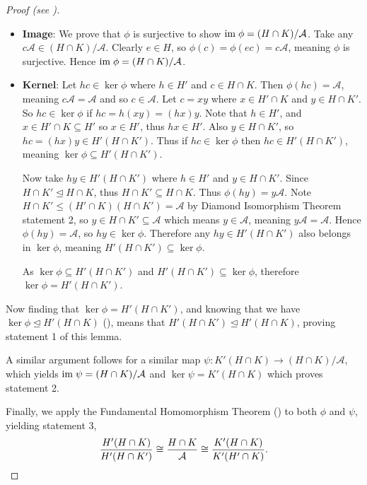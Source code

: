 \begin{proof}[Proof (see {\cite[Lemma I.8.9]{hungerford_1980}})]
\begin{itemize}
        \item \textbf{Image}: We prove that $\phi$ is surjective to show $\mathrm{im}\; \phi = (H\cap K)/\mathcal{A}$. Take any $c\mathcal{A} \in (H\cap K) / \mathcal{A}$. Clearly $e \in H$, so $\phi(c) = \phi(ec) = c\mathcal{A}$, meaning $\phi$ is surjective. Hence $\mathrm{im}\; \phi = (H\cap K)/\mathcal{A}$.

        \item \textbf{Kernel}: Let $hc \in \ker\phi$ where $h \in H'$ and $c \in H \cap K$. Then $\phi(hc) = \mathcal{A}$, meaning $c\mathcal{A} = \mathcal{A}$ and so $c \in \mathcal{A}$. Let $c = xy$ where $x \in H'\cap K$ and $y \in H \cap K'$. So $hc \in \ker\phi$ if $hc = h(xy) = (hx)y$. Note that $h \in H'$, and $x \in H' \cap K \subseteq H'$ so $x \in H'$, thus $hx \in H'$. Also $y \in H \cap K'$, so $hc = (hx)y \in H'(H \cap K')$. Thus if $hc \in \ker\phi$ then $hc \in H'(H \cap K')$, meaning $\ker\phi \subseteq H'(H \cap K')$.

        Now take $hy \in H'(H \cap K')$ where $h \in H'$ and $y \in H \cap K'$. Since $H \cap K' \unlhd H \cap K$, thus $H \cap K' \subseteq H \cap K$. Thus $\phi(hy) = y\mathcal{A}$. Note $H \cap K' \leq (H' \cap K)(H \cap K') = \mathcal{A}$ by Diamond Isomorphism Theorem statement 2, so $y \in H \cap K' \subseteq \mathcal{A}$ which means $y \in \mathcal{A}$, meaning $y\mathcal{A} = \mathcal{A}$. Hence $\phi(hy) = \mathcal{A}$, so $hy \in \ker\phi$. Therefore any $hy \in H'(H \cap K')$ also belongs in $\ker\phi$, meaning $H'(H \cap K') \subseteq \ker\phi$.

        As $\ker\phi \subseteq H'(H\cap K')$ and $H'(H\cap K') \subseteq \ker\phi$, therefore $\ker\phi = H'(H \cap K')$.
    \end{itemize}

    Now finding that $\ker\phi = H'(H \cap K')$, and knowing that we have $\ker\phi \unlhd H'(H\cap K)$ (), means that $H'(H \cap K') \unlhd H'(H\cap K)$, proving statement 1 of this lemma.

    A similar argument follows for a similar map $\psi: K'(H\cap K) \to (H\cap K)/\mathcal{A}$, which yields $\mathrm{im}\;\psi = (H\cap K)/\mathcal{A}$ and $\ker\psi = K'(H\cap K)$ which proves statement 2.

    Finally, we apply the Fundamental Homomorphism Theorem () to both $\phi$ and $\psi$, yielding statement 3,
    \[
        \frac{H'(H\cap K)}{H'(H\cap K')} \cong \frac{H\cap K}{\mathcal{A}} \cong \frac{K'(H\cap K)}{K'(H'\cap K)}.\qedhere
    \]
\end{proof}

